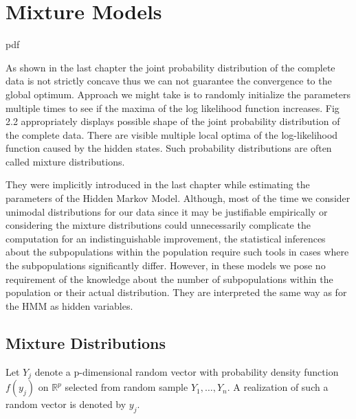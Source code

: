 \chapter{Mixture Models}

\if
pdf
    \graphicspath{{Chapter3/Figs/Raster/}{Chapter3/Figs/PDF/}{Chapter3/Figs/}}
\else
    \graphicspath{{Chapter3/Figs/Vector/}{Chapter3/Figs/}}
\fi


As shown in the last chapter the joint probability distribution of the complete 
data is not strictly concave thus we can not guarantee the convergence to the global optimum. 
Approach we might take is to randomly initialize the parameters multiple times to see 
if the maxima of the log likelihood function increases. 
Fig 2.2 appropriately displays possible shape of the joint probability distribution of the complete data. 
There are visible multiple local optima of the log-likelihood function caused by the hidden states. 
Such probability distributions are often called mixture distributions. 

They were implicitly introduced in the last chapter while estimating the parameters of the Hidden Markov Model. 
Although, most of the time we consider unimodal distributions for our data since it may be justifiable empirically 
or considering the mixture distributions could unnecessarily complicate the computation 
for an indistinguishable improvement, the statistical inferences about the subpopulations 
within the population require such tools in cases where the subpopulations significantly differ.
However, in these models we pose no requirement of the knowledge about the number of subpopulations 
within the population or their actual distribution. They are interpreted the same way as for the HMM 
as hidden variables.

\section{Mixture Distributions}

Let $Y_j$ denote a p-dimensional random vector with probability density function $f(y_j)$ on $\mathbb{R}^p$  
selected from random sample $Y_1,\ldots,Y_n$. A realization of such a random vector is denoted by $y_j$.

